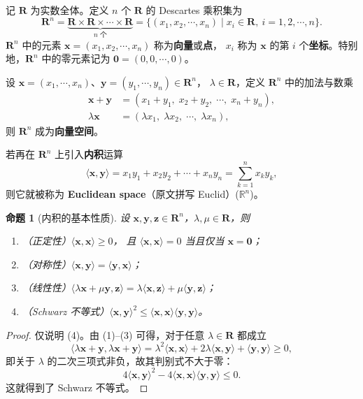 \documentclass[11pt]{ctexart}
\theoremstyle{plain}
\newtheorem{prop}[thm]{命题}
\theoremstyle{definition}
\theoremstyle{remark}
\begin{document}
记 \(\mathbf{R}\) 为实数全体。定义 \(n\) 个 \(\mathbf{R}\) 的 Descartes 乘积集为
\[
  \mathbf{R}^n=\underbrace{\mathbf{R}\times\mathbf{R}\times\cdots\times\mathbf{R}}_{n\text{ 个}}
  =\{(x_1,x_2,\cdots,x_n)\mid x_i\in\mathbf{R},\ i=1,2,\cdots,n\}.
\]
\(\mathbf{R}^n\) 中的元素 \(\boldsymbol{x}=(x_1,x_2,\cdots,x_n)\) 称为\textbf{向量}或\textbf{点}，
\(x_i\) 称为 \(\boldsymbol{x}\) 的第 \(i\) 个\textbf{坐标}。特别地，\(\mathbf{R}^n\) 中的零元素记为
\(\boldsymbol{0}=(0,0,\cdots,0)\)。

设 \(\boldsymbol{x}=(x_1,\cdots,x_n)\)、\(\boldsymbol{y}=(y_1,\cdots,y_n)\in\mathbf{R}^n\)，
\(\lambda\in\mathbf{R}\)，定义 \(\mathbf{R}^n\) 中的加法与数乘
\begin{align*}
  \boldsymbol{x}+\boldsymbol{y}&=(x_1+y_1,\;x_2+y_2,\;\cdots,\;x_n+y_n),\\
  \lambda\boldsymbol{x}&=(\lambda x_1,\;\lambda x_2,\;\cdots,\;\lambda x_n),
\end{align*}
则 \(\mathbf{R}^n\) 成为\textbf{向量空间}。

若再在 \(\mathbf{R}^n\) 上引入\textbf{内积}运算
\[
  \langle \boldsymbol{x},\boldsymbol{y}\rangle
  =x_1y_1+x_2y_2+\cdots+x_ny_n=\sum_{k=1}^{n}x_ky_k,
\]
则它就被称为 \textbf{Euclidean space}（原文拼写 Euclid）(\(\mathbb{R}^n\))。

\begin{prop}[内积的基本性质]\label{prop:inner}
设 \(\boldsymbol{x},\boldsymbol{y},\boldsymbol{z}\in\mathbf{R}^n\)，\(\lambda,\mu\in\mathbf{R}\)，则
\begin{enumerate}
  \item （正定性）\(\langle \boldsymbol{x},\boldsymbol{x}\rangle\ge 0\)，
        且 \(\langle \boldsymbol{x},\boldsymbol{x}\rangle=0\) 当且仅当 \(\boldsymbol{x}=\boldsymbol{0}\)；
  \item （对称性）\(\langle \boldsymbol{x},\boldsymbol{y}\rangle=\langle \boldsymbol{y},\boldsymbol{x}\rangle\)；
  \item （线性性）\(\langle \lambda\boldsymbol{x}+\mu\boldsymbol{y},\boldsymbol{z}\rangle
        =\lambda\langle \boldsymbol{x},\boldsymbol{z}\rangle
        +\mu\langle \boldsymbol{y},\boldsymbol{z}\rangle\)；
  \item （Schwarz 不等式）\(\langle \boldsymbol{x},\boldsymbol{y}\rangle^2
        \le\langle \boldsymbol{x},\boldsymbol{x}\rangle\langle \boldsymbol{y},\boldsymbol{y}\rangle\)。
\end{enumerate}
\end{prop}

\begin{proof}
仅说明 (4)。由 (1)--(3) 可得，对于任意 \(\lambda\in\mathbf{R}\) 都成立
\[
  \langle \lambda\boldsymbol{x}+\boldsymbol{y},\lambda\boldsymbol{x}+\boldsymbol{y}\rangle
  =\lambda^2\langle \boldsymbol{x},\boldsymbol{x}\rangle
  +2\lambda\langle \boldsymbol{x},\boldsymbol{y}\rangle
  +\langle \boldsymbol{y},\boldsymbol{y}\rangle\ge 0,
\]
即关于 \(\lambda\) 的二次三项式非负，故其判别式不大于零：
\[
  4\langle \boldsymbol{x},\boldsymbol{y}\rangle^2
  -4\langle \boldsymbol{x},\boldsymbol{x}\rangle\langle \boldsymbol{y},\boldsymbol{y}\rangle\le 0 .
\]
这就得到了 Schwarz 不等式。
\end{proof}
\end{document}
